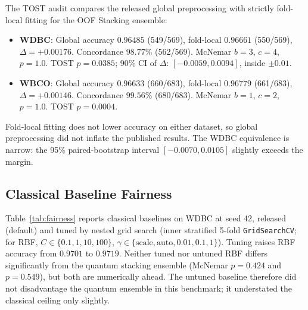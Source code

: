 \documentclass[journal,twocolumn]{IEEEtran}
\begin{document}
The TOST audit compares the released global preprocessing with strictly fold-local fitting for the OOF Stacking ensemble:
\begin{itemize}
    \item \textbf{WDBC}: Global accuracy $0.96485$ (549/569), fold-local $0.96661$ (550/569), $\Delta = +0.00176$. Concordance $98.77\%$ (562/569). McNemar $b=3$, $c=4$, $p = 1.0$. TOST $p = 0.0385$; 90\% CI of $\Delta$: $[-0.0059, 0.0094]$, inside $\pm0.01$.
    \item \textbf{WBCO}: Global accuracy $0.96633$ (660/683), fold-local $0.96779$ (661/683), $\Delta = +0.00146$. Concordance $99.56\%$ (680/683). McNemar $b=1$, $c=2$, $p = 1.0$. TOST $p = 0.0004$.
\end{itemize}
Fold-local fitting does not lower accuracy on either dataset, so global preprocessing did not inflate the published results. The WDBC equivalence is narrow: the 95\% paired-bootstrap interval $[-0.0070, 0.0105]$ slightly exceeds the margin.

\subsection{Classical Baseline Fairness}
\label{sec:fairness}

Table~\ref{tab:fairness} reports classical baselines on WDBC at seed 42, released (default) and tuned by nested grid search (inner stratified 5-fold \texttt{GridSearchCV}; for RBF, $C \in \{0.1, 1, 10, 100\}$, $\gamma \in \{\text{scale}, \text{auto}, 0.01, 0.1, 1\}$). Tuning raises RBF accuracy from $0.9701$ to $0.9719$. Neither tuned nor untuned RBF differs significantly from the quantum stacking ensemble (McNemar $p = 0.424$ and $p=0.549$), but both are numerically ahead. The untuned baseline therefore did not disadvantage the quantum ensemble in this benchmark; it understated the classical ceiling only slightly.
\end{document}
